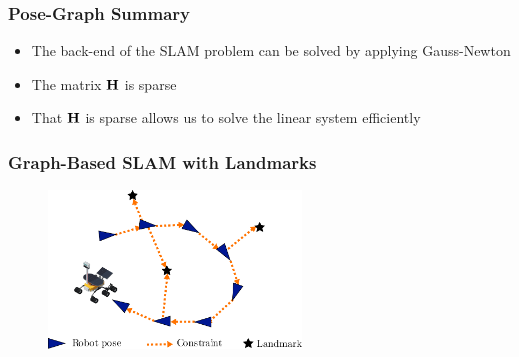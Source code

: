     \begin{frame}
    \frametitle{Pose-Graph Summary}
    
    \begin{itemize}
    \item The back-end of the SLAM problem can be solved by applying Gauss-Newton
    \item The matrix $\boldsymbol{\mathbf{H}}$ is sparse
    \item That $\boldsymbol{\mathbf{H}}$ is sparse allows us to solve the linear system efficiently
    \end{itemize}
    
    \end{frame}
    
    \begin{frame}
    \frametitle{Graph-Based SLAM with Landmarks}
    
     \begin{figure}[!h]
     \includegraphics[width=0.6\textwidth]{images/pose_landmark_graph_example.pdf}
     \end{figure}
    
    \end{frame}
    
